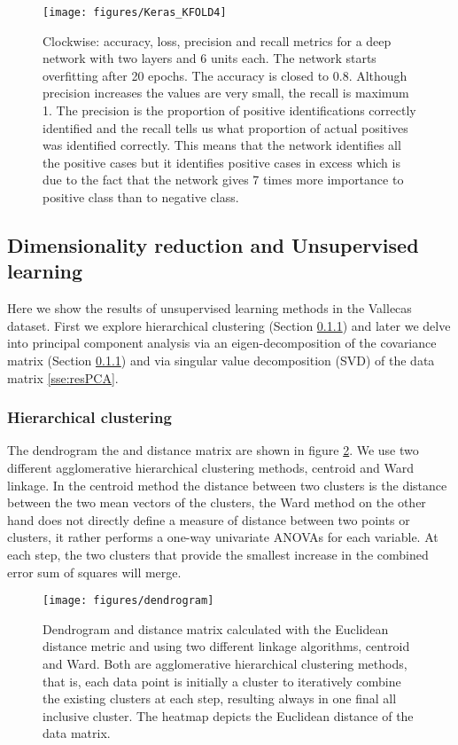 \documentclass[11pt]{article}
\theoremstyle{definition}
\theoremstyle{remark}
\begin{document}
{\begin{figure}[H]
        \centering
        \texttt{[image: figures/Keras\_KFOLD4]}
        \caption{Clockwise: accuracy, loss, precision and recall metrics for a deep network with two layers and 6 units each. The network starts overfitting after 20 epochs. The accuracy is closed to 0.8. Although precision increases the values are very small, the recall is maximum 1. The precision is the proportion of positive identifications correctly identified and the recall tells us what proportion of actual positives was identified correctly. This means that the network identifies all the positive cases but it identifies positive cases in excess which is due to the fact that the network gives 7 times more importance to positive class than to negative class. 
        } \label{fig:kerasmetricsres}
\end{figure}

\subsection{Dimensionality reduction and Unsupervised learning}
\label{sse:resunsupervised}
Here we show the results of unsupervised learning methods in the Vallecas dataset. First we explore hierarchical clustering (Section \ref{sse:reshierarchical}) and later we delve into principal component analysis via an eigen-decomposition of the covariance matrix (Section \ref{sse:reshierarchical}) and via singular value decomposition (SVD) of the data matrix \ref{sse:resPCA}.

\subsubsection{Hierarchical clustering}
\label{sse:reshierarchical}

The dendrogram the and distance matrix are shown in figure \ref{fig:dendrogram}. We use two different agglomerative hierarchical clustering methods, centroid and Ward linkage. In the centroid method the distance between two clusters is the distance between the two mean vectors of the clusters, the Ward method on the other hand does not directly define a measure of distance between two points or clusters, it rather performs a one-way univariate ANOVAs for each variable. At each step, the two clusters that provide the smallest increase in the combined error sum of squares will merge. 
\begin{figure}[H]
        \centering
        \texttt{[image: figures/dendrogram]}
        \caption{Dendrogram and distance matrix calculated with the Euclidean distance metric and using two different linkage algorithms, centroid and Ward. Both are agglomerative hierarchical clustering methods, that is, each data point is initially a cluster to iteratively combine the existing clusters at each step, resulting always in one final all inclusive cluster. The heatmap depicts the Euclidean distance of the data matrix.
        } \label{fig:dendrogram}
\end{figure}


}
\end{document}
